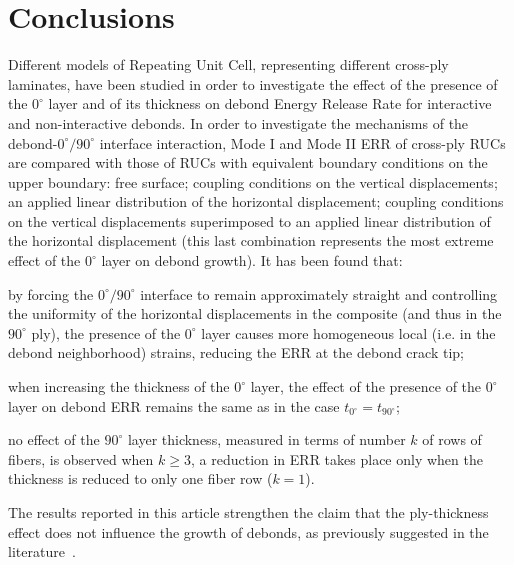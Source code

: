 \documentclass[review]{elsarticle}
\begin{document}
\section{Conclusions}

Different models of Repeating Unit Cell, representing different cross-ply laminates, have been studied in order to investigate the effect of the presence of the $0^{\circ}$ layer and of its thickness on debond Energy Release Rate for interactive and non-interactive debonds. In order to investigate the mechanisms of the debond-$0^{\circ}/90^{\circ}$ interface interaction, Mode I and Mode II ERR of cross-ply RUCs are compared with those of RUCs with equivalent boundary conditions on the upper boundary: free surface; coupling conditions on the vertical displacements; an applied linear distribution of the horizontal displacement; coupling conditions on the vertical displacements superimposed to an applied linear distribution of the horizontal displacement (this last combination represents the most extreme effect of the $0^{\circ}$ layer on debond growth). It has been found that:
\begin{itemize}[\label={--}]
\item by forcing the $0^{\circ}/90^{\circ}$ interface to remain approximately straight and controlling the uniformity of the horizontal displacements in the composite (and thus in the $90^{\circ}$ ply), the presence of the $0^{\circ}$ layer causes more homogeneous local (i.e. in the debond neighborhood) strains, reducing the ERR at the debond crack tip;
\item when increasing the thickness of the $0^{\circ}$ layer, the effect of the presence of the $0^{\circ}$ layer on debond ERR remains the same as in the case $t_{0^{\circ}}=t_{90^{\circ}}$;
\item no effect of the $90^{\circ}$ layer thickness, measured in terms of number $k$ of rows of fibers, is observed when $k\geq3$, a reduction in ERR takes place only when the thickness is reduced to only one fiber row ($k=1$).
\end{itemize}
The results reported in this article strengthen the claim that the ply-thickness effect does not influence the growth of debonds, as previously suggested in the literature~\cite{Saito2012,Herraez2015,Velasco2018, Paris2018}. 
\end{document}

